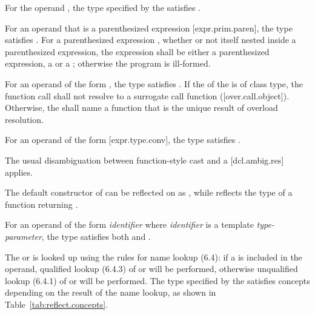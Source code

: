 \begin{std.txt}
For the operand \tcode{::}, the type specified by the
 satisfies .

For an operand that is a parenthesized expression [expr.prim.paren], the type
satisfies \linebreak{}.  For a parenthesized
expression , whether or not itself nested inside a parenthesized
expression, the expression  shall be either a parenthesized expression,
a  or a
; otherwise the program is
ill-formed.

For an operand of the form , the type
satisfies \linebreak{}.  If the
 of the 
is of class type, the function call shall not resolve to a surrogate call
function ([over.call.object]). Otherwise, the 
shall name a function that is the unique result of overload resolution.

For an operand of the form 
[expr.type.conv], the type satisfies \linebreak{}.
\begin{note}
The usual disambiguation between function-style cast and a
 [dcl.ambig.res] applies.
\begin{example}
The default constructor of  can be reflected on as
, while  reflects the type of a
function returning .
\end{example}
\end{note}

For an
operand of the form \emph{identifier} where \emph{identifier} is a template
\emph{type-parameter}, the type satisfies both  and
.

The  or  is looked up
using the rules for name lookup (6.4): if a 
is included in the operand, qualified lookup (6.4.3) of
 or
 will be performed,
otherwise unqualified lookup (6.4.1) of  or
 will be performed.  The type specified by the
 satisfies concepts depending on the result of
the name lookup, as shown in Table~\ref{tab:reflect.concepts}.


\end{std.txt}

